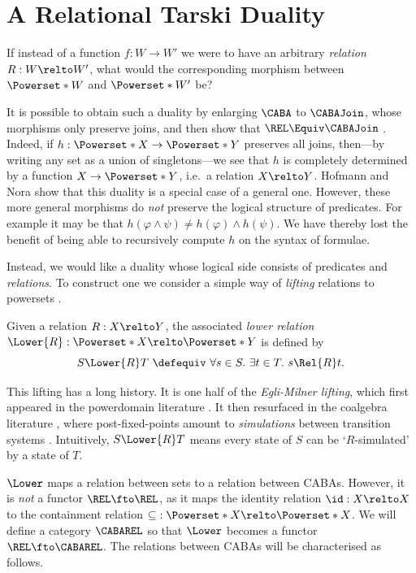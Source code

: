 \section{A Relational Tarski Duality}\label{section:relational-tarski}

If instead of a function $f : W \to W'$ we were to have an arbitrary
\emph{relation} $R : W \relto W'$, what would the corresponding morphism between
$\Powerset*{W}$ and $\Powerset*{W'}$ be?

It is possible to obtain such a duality by enlarging $\CABA$ to $\CABAJoin$,
whose morphisms only preserve joins, and then show that $\REL \Equiv \CABAJoin$
\cite{jonsson_1951,scott_1980} \cite[\S 2.3]{kishida_2018}. Indeed, if $h :
\Powerset*{X} \to \Powerset*{Y}$ preserves all joins, then---by writing any set
as a union of singletons---we see that $h$ is completely determined by a
function $X \to \Powerset*{Y}$, i.e.\ a relation $X \relto Y$. Hofmann and Nora
\cite[\S 4.5]{hofmann_2015} show that this duality is a special case of a
general one. However, these more general morphisms do \emph{not} preserve the
logical structure of predicates. For example it may be that $h(\varphi \land
\psi) \neq h(\varphi) \land h(\psi)$. We have thereby lost the benefit of being
able to recursively compute $h$ on the syntax of formulae.

Instead, we would like a duality whose logical side consists of predicates and
\emph{relations}. To construct one we consider a simple way of \emph{lifting}
relations to powersets \cite{kurz_2016}.

\begin{definition}
  Given a relation \(R : X \relto Y\), the associated \emph{lower relation}
  \(\Lower{R} : \Powerset*{X} \relto \Powerset*{Y}\) is defined by
  \[
    S \Lower{R} T\ \defequiv\ \forall s \in S.\ \exists t \in T.\ s \Rel{R} t.
  \]
\end{definition}

This lifting has a long history. It is one half of the \emph{Egli-Milner
lifting}, which first appeared in the powerdomain literature
\cite{plotkin_1976,plotkin_1979}. It then resurfaced in the coalgebra literature
\cite{thijs_1996}, where post-fixed-points amount to \emph{simulations} between
transition systems \cite[\S 3]{jacobs_2016}. Intuitively, \(S \Lower{R} T\)
means every state of \(S\) can be `$R$-simulated' by a state of \(T\).

\(\Lower\) maps a relation between sets to a relation between CABAs. However, it
is \emph{not} a functor $\REL \fto \REL$, as it maps the identity relation \(\id :
X \relto X\) to the containment relation \(\mathbin{\subseteq} : \Powerset*{X}
\relto \Powerset*{X}\). We will define a category \(\CABAREL\) so that
\(\Lower\) becomes a functor \(\REL \fto \CABAREL\). The relations between CABAs
will be characterised as follows.

